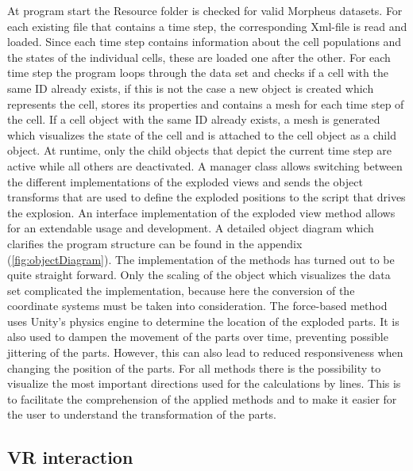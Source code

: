 At program start the Resource folder is checked for valid Morpheus datasets.
For each existing file that contains a time step, the corresponding Xml-file is read and loaded. 
Since each time step contains information about the cell populations and the states of the individual cells, these are loaded one after the other.
For each time step the program loops through the data set and checks if a cell with the same ID already exists, if this is not the case a new object is created which represents the cell, stores its properties and contains a mesh for each time step of the cell. 
If a cell object with the same ID already exists, a mesh is generated which visualizes the state of the cell and is attached to the cell object as a child object.
At runtime, only the child objects that depict the current time step are active while all others are deactivated.
A manager class allows switching between the different implementations of the exploded views and sends the object transforms that are used to define the exploded positions to the script that drives the explosion. 
An interface implementation of the exploded view method allows for an extendable usage and development. 
A detailed object diagram which clarifies the program structure can be found in the appendix (\ref{fig:objectDiagram}).
The implementation of the methods has turned out to be quite straight forward. Only the scaling of the object which visualizes the data set complicated the implementation, because here the conversion of the coordinate systems must be taken into consideration. 
The force-based method uses Unity's physics engine to determine the location of the exploded parts.
It is also used to dampen the movement of the parts over time, preventing possible jittering of the parts. 
However, this can also lead to reduced responsiveness when changing the position of the parts.
For all methods there is the possibility to visualize the most important directions used for the calculations by lines. 
This is to facilitate the comprehension of the applied methods and to make it easier for the user to understand the transformation of the parts.

\subsection{VR interaction}


